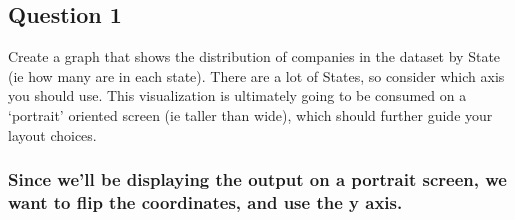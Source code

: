 \documentclass[]{article}
\newenvironment{Shaded}{\begin{snugshade}}{\end{snugshade}}
\newcommand{\KeywordTok}[1]{\textcolor[rgb]{0.13,0.29,0.53}{\textbf{#1}}}
\newcommand{\DataTypeTok}[1]{\textcolor[rgb]{0.13,0.29,0.53}{#1}}
\newcommand{\DecValTok}[1]{\textcolor[rgb]{0.00,0.00,0.81}{#1}}
\newcommand{\FloatTok}[1]{\textcolor[rgb]{0.00,0.00,0.81}{#1}}
\newcommand{\StringTok}[1]{\textcolor[rgb]{0.31,0.60,0.02}{#1}}
\newcommand{\CommentTok}[1]{\textcolor[rgb]{0.56,0.35,0.01}{\textit{#1}}}
\newcommand{\OperatorTok}[1]{\textcolor[rgb]{0.81,0.36,0.00}{\textbf{#1}}}
\newcommand{\NormalTok}[1]{#1}
\begin{document}
\subsection{Question 1}\label{question-1}

Create a graph that shows the distribution of companies in the dataset
by State (ie how many are in each state). There are a lot of States, so
consider which axis you should use. This visualization is ultimately
going to be consumed on a `portrait' oriented screen (ie taller than
wide), which should further guide your layout choices.

\subsubsection{Since we'll be displaying the output on a portrait
screen, we want to flip the coordinates, and use the y
axis.}\label{since-well-be-displaying-the-output-on-a-portrait-screen-we-want-to-flip-the-coordinates-and-use-the-y-axis.}

\begin{Shaded}
\end{Shaded}
\end{document}
